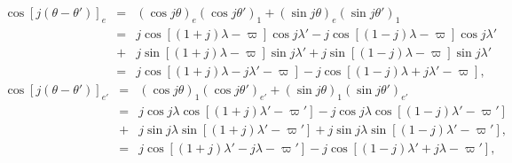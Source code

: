 \documentclass [12pt, a4paper] {article}
\begin{document}
\begin {eqnarray}
    \cos[j(\theta - \theta')]_e 
    &=&
    (\cos j\theta)_e(\cos j\theta')_1 + (\sin j\theta)_e(\sin j\theta')_1 
    \\
    &=&
    j\cos[(1+j)\lambda - \varpi]\cos j\lambda' 
    - 
    j\cos[(1-j)\lambda - \varpi]\cos j\lambda'
    \\\nonumber
    &+&
    j\sin[(1 + j)\lambda - \varpi]\sin j\lambda'
    + 
    j\sin[(1 - j)\lambda - \varpi]\sin j\lambda'
    \\
    &=&
    j\cos[(1+j)\lambda - j\lambda' - \varpi]
    -
    j\cos[(1-j)\lambda + j\lambda' - \varpi],
\end {eqnarray}
\begin {eqnarray}
    \cos[j(\theta - \theta')]_{e'} 
    &=&
    (\cos j\theta)_1(\cos j\theta')_{e'} + (\sin j\theta)_1(\sin j\theta')_{e'} 
    \\
    &=& 
    j\cos j\lambda \cos[(1+j)\lambda' - \varpi'] - j\cos j\lambda \cos[(1-j)\lambda' - \varpi']
    \\\nonumber
    &+& 
    j\sin j\lambda\sin[(1 + j)\lambda' - \varpi'] + j\sin j\lambda\sin[(1 - j)\lambda' - \varpi'],
    \\
    &=&
    j\cos[(1 + j)\lambda' - j\lambda - \varpi']
    - 
    j\cos[(1 - j)\lambda' + j\lambda - \varpi'],
\end {eqnarray}
\end{document}
